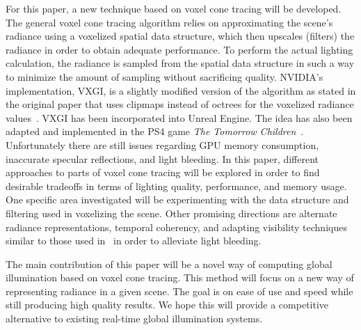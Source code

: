 For this paper, a new technique based on voxel cone tracing will be developed. The general voxel cone tracing algorithm relies on approximating the scene's radiance using a voxelized spatial data structure, which then upscales (filters) the radiance in order to obtain adequate performance. To perform the actual lighting calculation, the radiance is sampled from the spatial data structure in such a way to minimize the amount of sampling without sacrificing quality. NVIDIA's implementation, VXGI, is a slightly modified version of the algorithm as stated in the original paper that uses clipmaps instead of octrees for the voxelized radiance values~\cite{nvidiavxgi}. VXGI has been incorporated into Unreal Engine. The idea has also been adapted and implemented in the PS4 game \textit{The Tomorrow Children}~\cite{mclaren2016cascaded}.  Unfortunately there are still issues regarding GPU memory consumption, inaccurate specular reflections, and light bleeding. In this paper, different approaches to parts of voxel cone tracing will be explored in order to find desirable tradeoffs in terms of lighting quality, performance, and memory usage. One specific area investigated will be experimenting with the data structure and filtering used in voxelizing the scene. Other promising directions are alternate radiance representations, temporal coherency, and adapting visibility techniques similar to those used in~\cite{mcguire2017real} in order to alleviate light bleeding.

The main contribution of this paper will be a novel way of computing global illumination based on voxel cone tracing. This method will focus on a new way of representing radiance in a given scene. The goal is on ease of use and speed while still producing high quality results. We hope this will provide a competitive alternative to existing real-time global illumination systems.
\fi